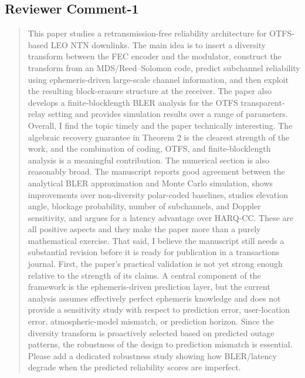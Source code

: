\subsection{Reviewer Comment-1}
\begin{mdframed}
\begin{quote}
This paper studies a retransmission-free reliability architecture for OTFS-based LEO NTN downlinks. The main idea is to insert a diversity transform between the FEC encoder and the modulator, construct the transform from an MDS/Reed–Solomon code, predict subchannel reliability using ephemeris-driven large-scale channel information, and then exploit the resulting block-erasure structure at the receiver. The paper also develops a finite-blocklength BLER analysis for the OTFS transparent-relay setting and provides simulation results over a range of parameters. Overall, I find the topic timely and the paper technically interesting. The algebraic recovery guarantee in Theorem 2 is the clearest strength of the work, and the combination of coding, OTFS, and finite-blocklength analysis is a meaningful contribution.
The numerical section is also reasonably broad. The manuscript reports good agreement between the analytical BLER approximation and Monte Carlo simulation, shows improvements over non-diversity polar-coded baselines, studies elevation angle, blockage probability, number of subchannels, and Doppler sensitivity, and argues for a latency advantage over HARQ-CC. These are all positive aspects and they make the paper more than a purely mathematical exercise.
That said, I believe the manuscript still needs a substantial revision before it is ready for publication in a transactions journal.
First, the paper's practical validation is not yet strong enough relative to the strength of its claims. A central component of the framework is the ephemeris-driven prediction layer, but the current analysis assumes effectively perfect ephemeris knowledge and does not provide a sensitivity study with respect to prediction error, user-location error, atmospheric-model mismatch, or prediction horizon. Since the diversity transform is proactively selected based on predicted outage patterns, the robustness of the design to prediction mismatch is essential. Please add a dedicated robustness study showing how BLER/latency degrade when the predicted reliability scores are imperfect.


\end{quote}

\end{mdframed}


